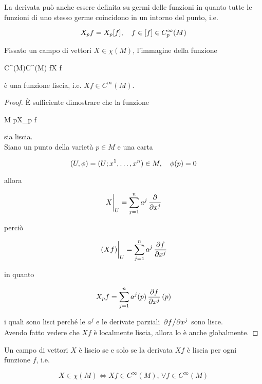 La derivata può anche essere definita su germi delle funzioni in quanto tutte le funzioni di uno stesso germe coincidono in un intorno del punto, i.e.

\begin{equation}
	X_{p} f = X_{p} [f] \qcomma f \in [f] \in C_{p}^{\infty}(M)
\end{equation}

\begin{definition}
	Fissato un campo di vettori $ X \in \chi(M) $, l'immagine della funzione
	
		{C^{\infty}(M)}{C^{\infty}(M)}
		{f}{X f}

	è una funzione liscia, i.e. $ X f \in C^{\infty}(M) $.
\end{definition}

\begin{proof}
	È sufficiente dimostrare che la funzione
	
		{M}{\R}
		{p}{X_{p} f}

	sia liscia.\\
	Siano un punto della varietà $ p \in M $ e una carta
	
	\begin{equation}
		(U,\phi) = (U; x^{1},\dots,x^{n}) \in M \qcomma \phi(p) = 0
	\end{equation}
	
	allora
	
	\begin{equation}
		\eval{X}_{U} = \sum_{j=1}^{n} a^{j} \, \pdv{x^{j}}
	\end{equation}

	perciò
	
	\begin{equation}
		\eval{(X f)}_{U} = \sum_{j=1}^{n} a^{j} \, \pdv{f}{x^{j}}
	\end{equation}

	in quanto
	
	\begin{equation}
		X_{p} f = \sum_{j=1}^{n} a^{j}(p) \, \pdv{f}{x^{j}} \, (p)
	\end{equation}

	i quali sono lisci perché le $ a^{j} $ e le derivate parziali $ \pdv*{f}{x^{j}} $ sono lisce.\\
	Avendo fatto vedere che $ X f $ è localmente liscia, allora lo è anche globalmente.
\end{proof}

\begin{definition}
	Un campo di vettori $ X $ è liscio se e solo se la derivata $ X f $ è liscia per ogni funzione $ f $, i.e.
	
	\begin{equation}
		X \in \chi(M) \iff X f \in C^{\infty}(M), \, \forall f \in C^{\infty}(M)
	\end{equation}
\end{definition}

